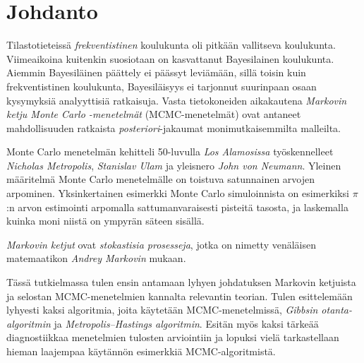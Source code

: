 \chapter{Johdanto}\label{johd}

Tilastotieteissä \textit{frekventistinen} koulukunta oli pitkään vallitseva koulukunta. Viimeaikoina kuitenkin suosiotaan on kasvattanut Bayesilainen koulukunta. Aiemmin Bayesiläinen päättely ei päässyt leviämään, sillä toisin kuin frekventistinen koulukunta, Bayesiläisyys ei tarjonnut suurinpaan osaan kysymyksiä analyyttisiä ratkaisuja. Vasta tietokoneiden aikakautena \textit{Markovin ketju Monte Carlo -menetelmät} (MCMC-menetelmät) ovat antaneet mahdollisuuden ratkaista \textit{posteriori}-jakaumat monimutkaisemmilta malleilta.

Monte Carlo menetelmän kehitteli 50-luvulla \textit{Los Alamosissa} työskennelleet \textit{Nicholas Metropolis}, \textit{Stanislav Ulam} ja yleisnero \textit{John von Neumann}. Yleinen määritelmä Monte Carlo menetelmälle on toistuva satunnainen arvojen arpominen. Yksinkertainen esimerkki Monte Carlo simuloinnista on esimerkiksi $\pi$:n arvon estimointi arpomalla sattumanvaraisesti pisteitä tasosta, ja laskemalla kuinka moni niistä on ympyrän säteen sisällä. 

\textit{Markovin ketjut} ovat \textit{stokastisia prosesseja}, jotka on nimetty venäläisen matemaatikon \textit{Andrey Markovin} mukaan. 

Tässä tutkielmassa tulen ensin antamaan lyhyen johdatuksen Markovin ketjuista ja selostan MCMC-menetelmien kannalta relevantin teorian. Tulen esittelemään lyhyesti kaksi algoritmia, joita käytetään MCMC-menetelmissä, \textit{Gibbsin otanta-algoritmin} ja \textit{Metropolis–Hastings algoritmin}. Esitän myös kaksi tärkeää diagnostiikkaa menetelmien tulosten arviointiin ja lopuksi vielä tarkastellaan hieman laajempaa käytännön esimerkkiä MCMC-algoritmistä.
